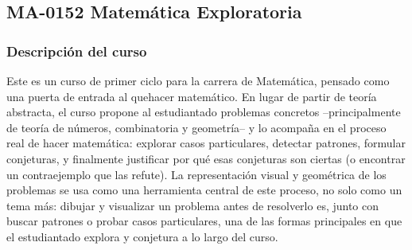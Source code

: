 \newpage
\subsection*{MA-0152 Matemática Exploratoria}
\hypertarget{MA0152}{}
\begin{refsection}
\begin{table}[H]
\end{table}

\subsubsection*{Descripción del curso}

Este es un curso de primer ciclo para la carrera de Matemática,
pensado como una puerta de entrada al quehacer matemático. En lugar
de partir de teoría abstracta, el curso propone al estudiantado
problemas concretos --principalmente de teoría de números,
combinatoria y geometría-- y lo acompaña en el proceso real de hacer
matemática: explorar casos particulares, detectar patrones, formular
conjeturas, y finalmente justificar por qué esas conjeturas son
ciertas (o encontrar un contraejemplo que las refute). La
representación visual y geométrica de los problemas se usa como una
herramienta central de este proceso, no solo como un tema más: dibujar
y visualizar un problema antes de resolverlo es, junto con buscar
patrones o probar casos particulares, una de las formas principales
en que el estudiantado explora y conjetura a lo largo del curso.


\end{refsection}
